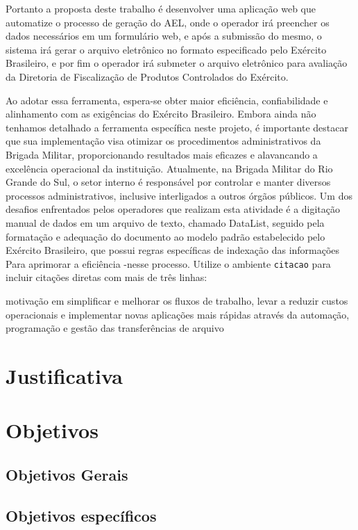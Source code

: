 Portanto a proposta deste trabalho é desenvolver uma aplicação web que automatize o processo de geração do AEL, onde o operador irá preencher os dados necessários em um formulário web, e após a submissão do mesmo, o sistema irá gerar o arquivo eletrônico no formato especificado pelo Exército Brasileiro, e por fim o operador irá submeter o arquivo eletrônico para avaliação da Diretoria de Fiscalização de Produtos Controlados do Exército.

Ao adotar essa ferramenta, espera-se obter maior eficiência, confiabilidade e alinhamento com as 
exigências do Exército Brasileiro. Embora ainda não tenhamos detalhado a ferramenta específica neste projeto,
é importante destacar que sua implementação visa otimizar os procedimentos administrativos da Brigada Militar, 
proporcionando resultados mais eficazes e alavancando a excelência operacional da instituição.
Atualmente, na Brigada Militar do Rio Grande do Sul, o setor interno é responsável por controlar e 
manter diversos processos administrativos, inclusive interligados a outros órgãos públicos. 
Um dos desafios enfrentados pelos operadores que realizam esta atividade é a digitação manual de dados em um 
arquivo de texto, chamado DataList, seguido pela formatação e adequação do documento ao modelo padrão 
estabelecido pelo Exército Brasileiro, que possui regras específicas de indexação das informações
Para aprimorar a eficiência -nesse processo.
Utilize o ambiente \texttt{citacao} para incluir
citações diretas com mais de três linhas:
\begin{citacao}
motivação em simplificar e melhorar os fluxos de trabalho, levar a reduzir custos operacionais e implementar novas aplicações mais rápidas através da automação, programação e gestão das transferências de arquivo\cite[5.3]{AndradeJunior}
\end{citacao}

\section{Justificativa}

\section{Objetivos}

\subsection{Objetivos Gerais}

\subsection{Objetivos específicos}
